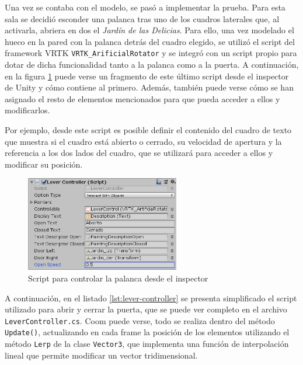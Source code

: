 Una vez se contaba con el modelo, se pasó a implementar la prueba. Para esta sala se decidió esconder una palanca tras uno de los cuadros laterales que, al activarla, abriera en dos el \textit{Jardín de las Delicias}. Para ello, una vez modelado el hueco en la pared con la palanca detrás del cuadro elegido, se utilizó el script del framework \acs{VRTK} \texttt{VRTK\_ArificialRotator} y se integró con un script propio para dotar de dicha funcionalidad tanto a la palanca como a la puerta. A continuación, en la figura \ref{fig:lever-controller-inspector} puede verse un fragmento de este último script desde el inspector de Unity y cómo contiene al primero. Además, también puede verse cómo se han asignado el resto de elementos mencionados para que pueda acceder a ellos y modificarlos.

Por ejemplo, desde este script es posible definir el contenido del cuadro de texto que muestra si el cuadro está abierto o cerrado, su velocidad de apertura y la referencia a los dos lados del cuadro, que se utilizará para acceder a ellos y modificar su posición.

\begin{figure}[!h]
\begin{center}
\includegraphics[width=0.6\textwidth]{imagenes/7/lever-controller.png}
\caption{Script para controlar la palanca desde el inspector}
\label{fig:lever-controller-inspector}
\end{center}
\end{figure}

A continuación, en el listado \ref{lst:lever-controller} se presenta simplificado el script utilizado para abrir y cerrar la puerta, que se puede ver completo en el archivo \texttt{LeverController.cs}. Coom puede verse, todo se realiza dentro del método \texttt{Update()}, actualizando en cada frame la posición de los elementos utilizando el método \texttt{Lerp} de la clase \texttt{Vector3}, que implementa una función de interpolación lineal que permite modificar un vector tridimensional.


